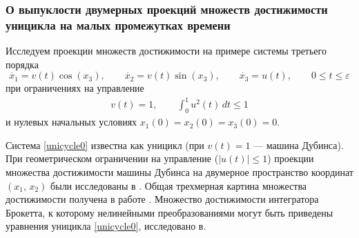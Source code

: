 \documentclass[../main.tex]{subfiles}
\begin{document}
\subsubsection{О выпуклости двумерных проекций множеств достижимости уницикла на малых промежутках времени}	
	Исследуем проекции множеств достижимости на примере системы третьего порядка
	\begin{equation}\label{unicycle0}
		\dot{x_1} = v(t)\cos(x_3), \qquad
		\dot{x_2} = v(t)\sin(x_3), \qquad
		\dot{x_3} = u(t), \qquad 0 \leq t \leq \varepsilon
	\end{equation}
	при ограничениях на управление 
	\begin{gather*}
		v(t) = 1, \qquad \int_0^1 u^2(t) \, dt \leqslant 1
	\end{gather*}
	и нулевых начальных условиях $ x_1(0) = x_2(0) = x_3(0) = 0 $.
	
	Система \eqref{unicycle0} известна как уницикл (при $ v(t) = 1$  --- машина Дубинса). При геометрическом
	ограничении на
	управление ($|u(t)|\leq 1$) проекции множества достижимости  машины Дубинса  на двумерное пространство координат $(x_1,\,x_2)$ были исследованы в
	\cite{Cockayne}. Общая трехмерная картина множества достижимости  получена в
	работе  \cite{Patsko}. Множество достижимости интегратора Брокетта, к которому нелинейными преобразованиями могут быть приведены уравнения уницикла \eqref{unicycle0}, исследовано в\cite{Vdovin}.
	
\end{document}
